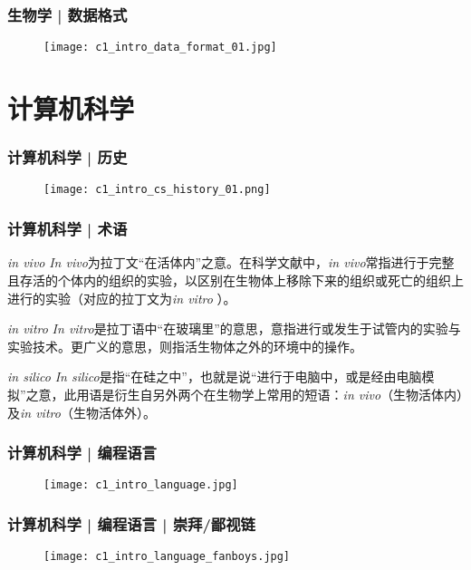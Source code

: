 \begin{frame}
  \frametitle{生物学 | 数据格式}
  \begin{figure}
    \centering
    \texttt{[image: c1\_intro\_data\_format\_01.jpg]}
  \end{figure}
\end{frame}

\section{计算机科学}
\begin{frame}
  \frametitle{计算机科学 | 历史}
  \begin{figure}
    \centering
    \texttt{[image: c1\_intro\_cs\_history\_01.png]}
  \end{figure}
\end{frame}

\begin{frame}
  \frametitle{计算机科学 | \alert{术语}}
  \begin{block}{\textit{in vivo}}
  \textit{In vivo}为拉丁文“在活体内”之意。在科学文献中，\textit{in vivo}常指进行于完整且存活的个体内的组织的实验，以区别在生物体上移除下来的组织或死亡的组织上进行的实验（对应的拉丁文为\textit{in vitro }）。
  \end{block}
  \pause
  \begin{block}{\textit{in vitro}}
    \textit{In vitro}是拉丁语中“在玻璃里”的意思，意指进行或发生于试管内的实验与实验技术。更广义的意思，则指活生物体之外的环境中的操作。
  \end{block}
  \pause
  \begin{block}{\textit{in silico}}
    \textit{In
    silico}是指“在硅之中”，也就是说“进行于电脑中，或是经由电脑模拟”之意，此用语是衍生自另外两个在生物学上常用的短语：\textit{in vivo}（生物活体内）及\textit{in vitro}（生物活体外）。
  \end{block}
\end{frame}

\begin{frame}
  \frametitle{计算机科学 | 编程语言}
  \begin{figure}
    \centering
    \texttt{[image: c1\_intro\_language.jpg]}
  \end{figure}
\end{frame}

\begin{frame}
  \frametitle{计算机科学 | 编程语言 | 崇拜/鄙视链}
  \begin{figure}
    \centering
    \texttt{[image: c1\_intro\_language\_fanboys.jpg]}
  \end{figure}
\end{frame}

